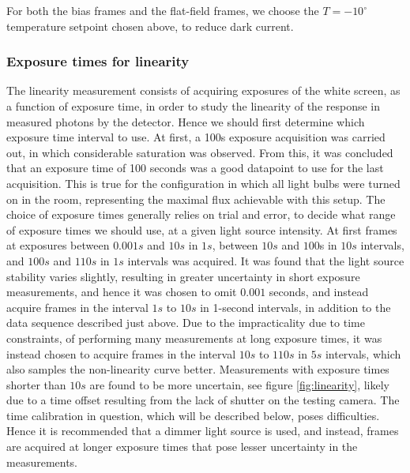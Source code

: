 \documentclass[../main.tex]{subfiles}
\begin{document}
		For both the bias frames and the flat-field frames, we choose the $T= -10^\circ$ temperature setpoint chosen above, to reduce dark current.
		
		\subsubsection{Exposure times for linearity}\label{sec:explin}
		The linearity measurement consists of acquiring exposures of the white screen, as a function of exposure time, in order to study the linearity of the response in measured photons by the detector. Hence we should first determine which exposure time interval to use. At first, a 100s exposure acquisition was carried out, in which considerable saturation was observed. From this, it was concluded that an exposure time of 100 seconds was a good datapoint to use for the last acquisition. This is true for the configuration in which all light bulbs were turned on in the room, representing the maximal flux achievable with this setup. The choice of exposure times generally relies on trial and error, to decide what range of exposure times we should use, at a given light source intensity. At first frames at exposures between $0.001s$ and $10s$ in $1s$, between $10s$ and $100$s in $10s$ intervals, and $100s$ and $110s$ in $1s$ intervals was acquired. It was found that the light source stability varies slightly, resulting in greater uncertainty in short exposure measurements, and hence it was chosen to omit $0.001$ seconds, and instead acquire frames in the interval $1s$ to $10s$ in 1-second intervals, in addition to the data sequence described just above. Due to the impracticality due to time constraints, of performing many measurements at long exposure times, it was instead chosen to acquire frames in the interval $10s$ to $110s$ in $5s$ intervals, which also samples the non-linearity curve better. Measurements with exposure times shorter than $10s$ are found to be more uncertain, see figure \ref{fig:linearity}, likely due to a time offset resulting from the lack of shutter on the testing camera. The time calibration in question, which will be described below, poses difficulties. Hence it is recommended that a dimmer light source is used, and instead, frames are acquired at longer exposure times that pose lesser uncertainty in the measurements. 
		
\end{document}
